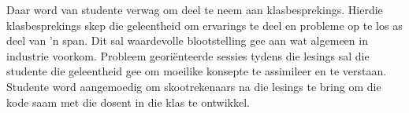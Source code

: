     Daar word van studente verwag om deel te neem aan
    klasbesprekings. Hierdie klasbesprekings skep die geleentheid om
    ervarings te deel en probleme op te los as deel van 'n span.  Dit
    sal waardevolle blootstelling gee aan wat algemeen in industrie
    voorkom. Probleem geori\"{e}nteerde sessies tydens die lesings sal
    die studente die geleentheid gee om moeilike konsepte te
    assimileer en te verstaan. Studente word aangemoedig om
    skootrekenaars na die lesings te bring om die kode saam met die
    dosent in die klas te ontwikkel.




    
